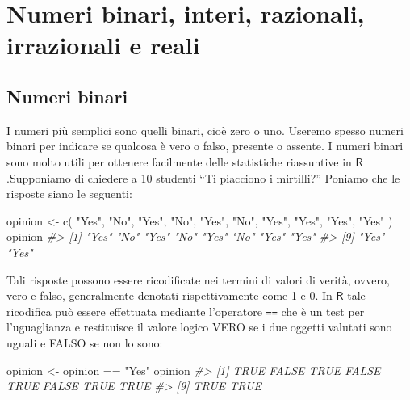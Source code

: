 \documentclass[
  11pt,
]{krantz}
\makeatletter
\newenvironment{Shaded}{\begin{snugshade}}{\end{snugshade}}
\newcommand{\CommentTok}[1]{\textcolor[rgb]{0.37,0.37,0.37}{\textit{#1}}}
\newcommand{\FunctionTok}[1]{\textcolor[rgb]{0,0,0}{#1}}
\newcommand{\NormalTok}[1]{#1}
\newcommand{\OtherTok}[1]{\textcolor[rgb]{0.37,0.37,0.37}{#1}}
\newcommand{\SpecialCharTok}[1]{\textcolor[rgb]{0,0,0}{#1}}
\newcommand{\StringTok}[1]{\textcolor[rgb]{0.5,0.5,0.5}{#1}}
\newenvironment{kframe}{%
\medskip{}
\setlength{\fboxsep}{.8em}
 \def\at@end@of@kframe{}%
 \ifinner\ifhmode%
  \def\at@end@of@kframe{\end{minipage}}%
  \begin{minipage}{\columnwidth}%
 \fi\fi%
 \def\FrameCommand##1{\hskip\@totalleftmargin \hskip-\fboxsep
 \colorbox{shadecolor}{##1}\hskip-\fboxsep
     \hskip-\linewidth \hskip-\@totalleftmargin \hskip\columnwidth}%
 \MakeFramed {\advance\hsize-\width
   \@totalleftmargin\z@ \linewidth\hsize
   \@setminipage}}%
 {\par\unskip\endMakeFramed%
 \at@end@of@kframe}
\renewenvironment{Shaded}{\begin{kframe}}{\end{kframe}}
\newcommand{\R}{\textsf{R}} %
\theoremstyle{definition}
\theoremstyle{definition}
\theoremstyle{definition}
\theoremstyle{definition}
\theoremstyle{remark}
\makeatother
\begin{document}
\hypertarget{numeri-binari-interi-razionali-irrazionali-e-reali}{%
\chapter{Numeri binari, interi, razionali, irrazionali e reali}\label{numeri-binari-interi-razionali-irrazionali-e-reali}}

\hypertarget{numeri-binari}{%
\section{Numeri binari}\label{numeri-binari}}

I numeri più semplici sono quelli binari, cioè zero o uno. Useremo spesso numeri binari per indicare se qualcosa è vero o falso, presente o assente. I numeri binari sono molto utili per ottenere facilmente delle statistiche riassuntive in \(\R\).Supponiamo di chiedere a 10 studenti ``Ti piacciono i mirtilli?'' Poniamo che le risposte siano le seguenti:

\begin{Shaded}
\begin{Highlighting}[]
\NormalTok{opinion }\OtherTok{\textless{}{-}} \FunctionTok{c}\NormalTok{(}
  \StringTok{"Yes"}\NormalTok{, }\StringTok{"No"}\NormalTok{, }\StringTok{"Yes"}\NormalTok{, }\StringTok{"No"}\NormalTok{, }\StringTok{"Yes"}\NormalTok{, }\StringTok{"No"}\NormalTok{, }\StringTok{"Yes"}\NormalTok{,}
  \StringTok{"Yes"}\NormalTok{, }\StringTok{"Yes"}\NormalTok{, }\StringTok{"Yes"}
\NormalTok{)}
\NormalTok{opinion}
\CommentTok{\#\textgreater{}  [1] "Yes" "No"  "Yes" "No"  "Yes" "No"  "Yes" "Yes"}
\CommentTok{\#\textgreater{}  [9] "Yes" "Yes"}
\end{Highlighting}
\end{Shaded}

Tali risposte possono essere ricodificate nei termini di valori di verità, ovvero, vero e falso, generalmente denotati rispettivamente come 1 e 0. In \(\R\) tale ricodifica può essere effettuata mediante l'operatore \texttt{==} che è un test per l'uguaglianza e restituisce il valore logico VERO se i due oggetti valutati sono uguali e FALSO se non lo sono:

\begin{Shaded}
\begin{Highlighting}[]
\NormalTok{opinion }\OtherTok{\textless{}{-}}\NormalTok{ opinion }\SpecialCharTok{==} \StringTok{"Yes"}
\NormalTok{opinion}
\CommentTok{\#\textgreater{}  [1]  TRUE FALSE  TRUE FALSE  TRUE FALSE  TRUE  TRUE}
\CommentTok{\#\textgreater{}  [9]  TRUE  TRUE}
\end{Highlighting}
\end{Shaded}
\end{document}
